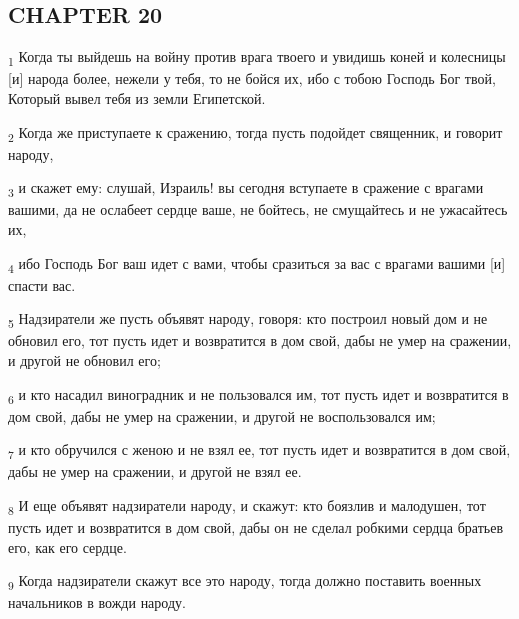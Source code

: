\subsection{CHAPTER 20}
\begin{tcolorbox}
\textsubscript{1} Когда ты выйдешь на войну против врага твоего и увидишь коней и колесницы [и] народа более, нежели у тебя, то не бойся их, ибо с тобою Господь Бог твой, Который вывел тебя из земли Египетской.
\end{tcolorbox}
\begin{tcolorbox}
\textsubscript{2} Когда же приступаете к сражению, тогда пусть подойдет священник, и говорит народу,
\end{tcolorbox}
\begin{tcolorbox}
\textsubscript{3} и скажет ему: слушай, Израиль! вы сегодня вступаете в сражение с врагами вашими, да не ослабеет сердце ваше, не бойтесь, не смущайтесь и не ужасайтесь их,
\end{tcolorbox}
\begin{tcolorbox}
\textsubscript{4} ибо Господь Бог ваш идет с вами, чтобы сразиться за вас с врагами вашими [и] спасти вас.
\end{tcolorbox}
\begin{tcolorbox}
\textsubscript{5} Надзиратели же пусть объявят народу, говоря: кто построил новый дом и не обновил его, тот пусть идет и возвратится в дом свой, дабы не умер на сражении, и другой не обновил его;
\end{tcolorbox}
\begin{tcolorbox}
\textsubscript{6} и кто насадил виноградник и не пользовался им, тот пусть идет и возвратится в дом свой, дабы не умер на сражении, и другой не воспользовался им;
\end{tcolorbox}
\begin{tcolorbox}
\textsubscript{7} и кто обручился с женою и не взял ее, тот пусть идет и возвратится в дом свой, дабы не умер на сражении, и другой не взял ее.
\end{tcolorbox}
\begin{tcolorbox}
\textsubscript{8} И еще объявят надзиратели народу, и скажут: кто боязлив и малодушен, тот пусть идет и возвратится в дом свой, дабы он не сделал робкими сердца братьев его, как его сердце.
\end{tcolorbox}
\begin{tcolorbox}
\textsubscript{9} Когда надзиратели скажут все это народу, тогда должно поставить военных начальников в вожди народу.
\end{tcolorbox}
